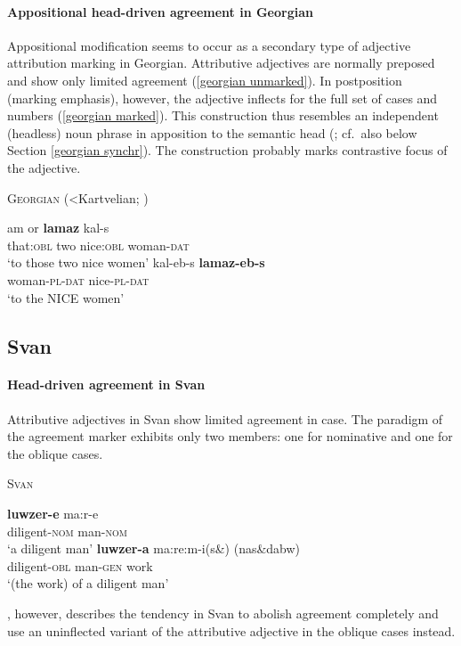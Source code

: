 \paragraph{Appositional head-driven agreement in Georgian}
Appositional modification seems to occur as a secondary type of adjective attribution marking in Georgian. Attributive adjectives are normally preposed and show only limited agreement (\ref{georgian unmarked}). In postposition (marking emphasis), however, the adjective inflects for the full set of cases and numbers (\ref{georgian marked}). This construction thus resembles an independent (headless) noun phrase in apposition to the semantic head (\citealt[652, 677]{testelec1998}; cf.~also below Section \ref{georgian synchr}). The construction probably marks contrastive focus of the adjective.
\begin{exe}
\ex \textsc{Georgian} (<Kartvelian; \citealt[652]{testelec1998})
\begin{xlist}
\ex \label{georgian unmarked}
\gll	am or \textbf{lamaz} kal-s\\
	that:\textsc{obl} two nice:\textsc{obl} woman-\textsc{dat}\\
\glt	‘to those two nice women’
\ex \label{georgian marked}
\gll	kal-eb-s \textbf{lamaz-eb-s}\\
	woman-\textsc{pl}-\textsc{dat} nice-\textsc{pl}-\textsc{dat}\\
\glt	‘to the NICE women’
\end{xlist}
\end{exe}

\subsection{Svan}
\paragraph{Head-driven agreement in Svan}
Attributive adjectives in Svan show limited agreement in case. The paradigm of the agreement marker exhibits only two members: one for nominative and one for the oblique cases.
\begin{exe}
\ex \textsc{Svan} \cite[18]{tuite1997}
\begin{xlist}
\ex	
\gll 	\textbf{luwzer-e}	ma:r-e\\
	diligent-\textsc{nom} man-\textsc{nom}\\
\glt	‘a diligent man’
\ex	
\gll	\textbf{luwzer-a}	ma:re:m-i(s\&) (nas\&dabw)\\
	diligent-\textsc{obl} man-\textsc{gen} work\\
\glt	‘(the work) of a diligent man’
\end{xlist}
\end{exe}
\citet[499]{schmidt1991}, however, describes the tendency in Svan to abolish agreement completely and use an uninflected variant of the attributive adjective in the oblique cases instead.

